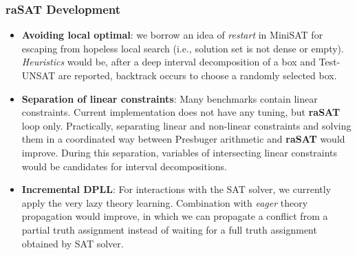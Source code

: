 \documentclass[runningheads,a4paper,oribibl]{llncs}
\begin{document}
{\subsubsection{\textbf{raSAT} Development}

\begin{itemize}
\item \textbf{Avoiding local optimal}: 
we borrow an idea of \emph{restart} in MiniSAT for escaping from hopeless local search 
(i.e., solution set is not dense or empty). 
\emph{Heuristics} would be, after a deep interval decomposition of 
a box and Test-UNSAT are reported, backtrack occurs to choose a randomly selected box. 

\item \textbf{Separation of linear constraints}: 
Many benchmarks contain linear constraints. Current implementation does not have 
any tuning, but {\bf raSAT} loop only. 
Practically, separating linear and non-linear constraints and solving them 
in a coordinated way between Presbuger arithmetic and {\bf raSAT} would improve. 
During this separation, variables of intersecting linear constraints would be candidates 
for interval decompositions. 

\item \textbf{Incremental DPLL}: For interactions with the SAT solver, 
we currently apply the very lazy theory learning. Combination with 
\emph{eager} theory propagation would improve, in which we can propagate 
a conflict from a partial truth assignment instead of waiting 
for a full truth assignment obtained by SAT solver.
\end{itemize}
}
\end{document}
